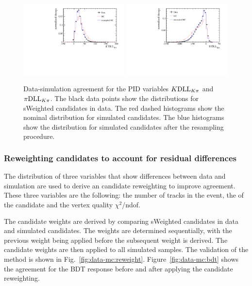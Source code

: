 \begin{figure}[!tb]
 \centering
 \includegraphics[width=0.49\textwidth]{figs/kpimm/data-mc/resampling/K_PIDK.pdf}
 \includegraphics[width=0.49\textwidth]{figs/kpimm/data-mc/resampling/Pi_PIDK.pdf}
 \caption{Data-simulation agreement for the PID variables ${K}\mathrm{DLL}_{{K}{\pi}}$ and ${\pi}\mathrm{DLL}_{{K}{\pi}}$. The black data points show the distributions for sWeighted \BdToJPsiKst candidates in data. The red dashed histograms show the nominal distribution for simulated \BdToJPsiKst candidates. The blue histograms show the distribution for simulated \BdToJPsiKst candidates after the resampling procedure.}
\label{fig:kpimm:data-mc:pid}
\end{figure}

\subsubsection{Reweighting candidates to account for residual differences}
\label{sec:kpimm:data-mc:reweight}

The distribution of three variables that show differences between data and simulation are used to derive an candidate reweighting to improve agreement. These three variables are the following: the number of tracks in the event, the \pt of the \Bz candidate and the \Bz vertex quality $\chi^{2}$/ndof.
 
The candidate weights are derived by comparing sWeighted \BdToJPsiKst candidates in data and simulated \BdToJPsiKst candidates. 
The weights are determined sequentially, with the previous weight being applied before the subsequent weight is derived. The candidate weights are then applied to all simulated samples. The validation of the method is shown in Fig.~\ref{fig:data-mc:reweight}. Figure~\ref{fig:data-mc:bdt} shows the agreement for the BDT response before and after applying the candidate reweighting.

